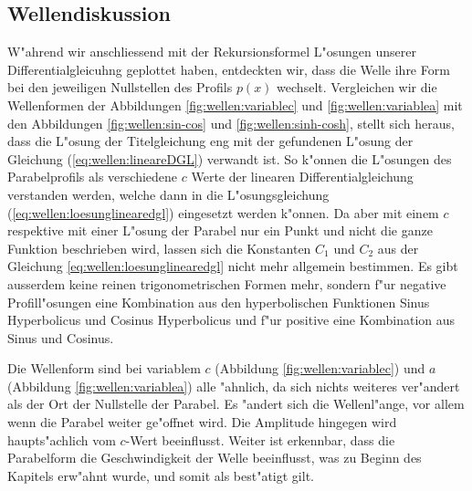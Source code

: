 \subsection{Wellendiskussion}
\label{sec:wellen:diskussionwellenform}

W"ahrend wir anschliessend mit der Rekursionsformel L"osungen unserer 
Differentialgleicuhng geplottet haben, entdeckten wir, dass die Welle ihre Form 
bei den jeweiligen Nullstellen des Profils $p(x)$ wechselt. Vergleichen wir die 
Wellenformen der Abbildungen \ref{fig:wellen:variablec} und 
\ref{fig:wellen:variablea} mit den Abbildungen \ref{fig:wellen:sin-cos} und 
\ref{fig:wellen:sinh-cosh}, stellt sich heraus, dass die L"osung der 
Titelgleichung eng mit der gefundenen L"osung der Gleichung 
(\ref{eq:wellen:lineareDGL}) verwandt ist. So k"onnen die L"osungen des 
Parabelprofils als verschiedene $c$ Werte der linearen Differentialgleichung 
verstanden werden, welche dann in die L"osungsgleichung 
(\ref{eq:wellen:loesunglinearedgl}) eingesetzt werden k"onnen. 
Da aber mit einem $c$ respektive mit einer L"osung der Parabel nur ein Punkt 
und nicht die ganze Funktion beschrieben wird, lassen sich die Konstanten $C_1$ 
und $C_2$ aus der Gleichung \ref{eq:wellen:loesunglinearedgl} nicht mehr 
allgemein bestimmen. Es gibt ausserdem keine reinen trigonometrischen Formen 
mehr, sondern f"ur negative Profill"osungen eine Kombination aus den 
hyperbolischen Funktionen Sinus Hyperbolicus und Cosinus Hyperbolicus und f"ur 
positive eine Kombination aus Sinus und Cosinus.

Die Wellenform sind bei variablem $c$ (Abbildung \ref{fig:wellen:variablec}) 
und $a$ (Abbildung \ref{fig:wellen:variablea}) alle "ahnlich, da sich nichts 
weiteres ver"andert als der Ort der Nullstelle der Parabel. Es "andert sich die 
Wellenl"ange, vor allem wenn die Parabel weiter ge"offnet wird. Die Amplitude 
hingegen wird haupts"achlich vom $c$-Wert beeinflusst. Weiter ist erkennbar, 
dass die Parabelform die Geschwindigkeit der Welle beeinflusst, was zu Beginn 
des Kapitels erw"ahnt wurde, und somit als best"atigt gilt.

